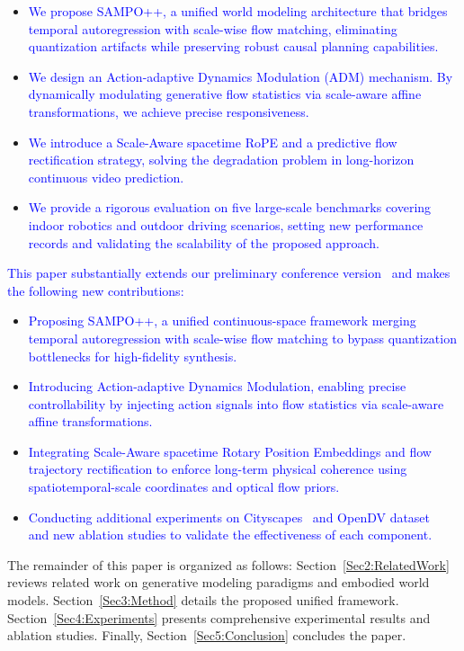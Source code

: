\begin{itemize}
    \item \textcolor{blue}{We propose SAMPO++, a unified world modeling architecture that bridges temporal autoregression with scale-wise flow matching, eliminating quantization artifacts while preserving robust causal planning capabilities.}
    
    \item \textcolor{blue}{We design an Action-adaptive Dynamics Modulation (ADM) mechanism. By dynamically modulating generative flow statistics via scale-aware affine transformations, we achieve precise responsiveness.}
        
    \item \textcolor{blue}{We introduce a Scale-Aware spacetime RoPE and a predictive flow rectification strategy, solving the degradation problem in long-horizon continuous video prediction.}
    
    \item \textcolor{blue}{We provide a rigorous evaluation on five large-scale benchmarks covering indoor robotics and outdoor driving scenarios, setting new performance records and validating the scalability of the proposed approach.}
\end{itemize}

\textcolor{blue}{This paper substantially extends our preliminary conference version~\cite{wang2025sampo} and makes the following new contributions:}
\begin{itemize}
    \item \textcolor{blue}{Proposing SAMPO++, a unified continuous-space framework merging temporal autoregression with scale-wise flow matching to bypass quantization bottlenecks for high-fidelity synthesis.}
    
    \item \textcolor{blue}{Introducing Action-adaptive Dynamics Modulation, enabling precise controllability by injecting action signals into flow statistics via scale-aware affine transformations.}
    
    \item \textcolor{blue}{Integrating Scale-Aware spacetime Rotary Position Embeddings and flow trajectory rectification to enforce long-term physical coherence using spatiotemporal-scale coordinates and optical flow priors.}

    \item \textcolor{blue}{Conducting additional experiments on Cityscapes~\cite{Cityscapes} and OpenDV dataset~\cite{yang2024genad} and new ablation studies to validate the effectiveness of each component.}
\end{itemize}

The remainder of this paper is organized as follows: Section~\ref{Sec2:RelatedWork} reviews related work on generative modeling paradigms and embodied world models. Section~\ref{Sec3:Method} details the proposed unified framework. Section~\ref{Sec4:Experiments} presents comprehensive experimental results and ablation studies. Finally, Section~\ref{Sec5:Conclusion} concludes the paper.

